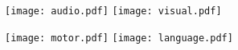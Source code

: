 \documentclass{article}
\begin{document}
\pagestyle{empty}

\begin{preview}
    \texttt{[image: audio.pdf]}%
    \hfill%
    \texttt{[image: visual.pdf]}

    \texttt{[image: motor.pdf]}%
    \hfill%
    \texttt{[image: language.pdf]}

\end{preview}
\end{document}
